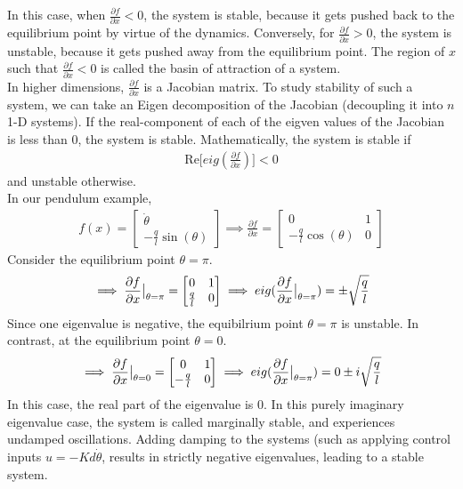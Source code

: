\documentclass{article}
\begin{document}
\noindent
In this case, when $\frac{\partial f}{\partial x}<0$, the system is stable, because it gets pushed back to the equilibrium point by virtue of the dynamics. Conversely, for $\frac{\partial f}{\partial x}>0$, the system is unstable, because it gets pushed away from the equilibrium point.
The region of $x$ such that  $\frac{\partial f}{\partial x}<0$ is called the basin of attraction of a system.
\\

\noindent
In higher dimensions, $\frac{\partial f}{\partial x}$ is a Jacobian matrix. To study stability of such a system, we can take an Eigen decomposition of the Jacobian (decoupling it into $n$ 1-D systems). If the real-component of each of the eigven values of the Jacobian is less than $0$, the system is stable. Mathematically, the system is stable if
\begin{align}
    \textrm{Re} \big[ eig ( \frac{\partial f}{\partial x} ) \big] < 0 
\end{align}
and unstable otherwise. \\

\noindent
In our pendulum example, 
\begin{align}
    f(x) = \begin{bmatrix}
        \dot{\theta} \\
        - \frac{q}{l} \sin(\theta) 
    \end{bmatrix}
    \implies
    \frac{\partial f}{\partial x} = \begin{bmatrix}
        0 & 1 \\
        - \frac{q}{l} \cos(\theta) & 0
    \end{bmatrix}
\end{align}
Consider the equilibrium point $\theta=\pi$. 
\begin{align}
    \implies
        \evalat{\frac{\partial f}{\partial x}}{\theta=\pi} = \begin{bmatrix}
        0 & 1 \\
        \frac{q}{l} & 0
    \end{bmatrix}
    \implies
    eig(\evalat{\frac{\partial f}{\partial x}}{\theta=\pi}) = \pm \sqrt{\frac{q}{l}}
\end{align}
Since one eigenvalue is negative, the equibilrium point $\theta=\pi$ is unstable.
In contrast, at the equilibrium point $\theta=0$. 
\begin{align}
    \implies
        \evalat{\frac{\partial f}{\partial x}}{\theta=0} = \begin{bmatrix}
        0 & 1 \\
        - \frac{q}{l} & 0
    \end{bmatrix}
    \implies
    eig(\evalat{\frac{\partial f}{\partial x}}{\theta=\pi}) = 0 \pm i \sqrt{\frac{q}{l}}
\end{align}
In this case, the real part of the eigenvalue is $0$. In this purely imaginary eigenvalue case, the system is called marginally stable, and experiences undamped oscillations. 
Adding damping to the systems (such as applying control inputs $u = - K d \dot{\theta}$, results in strictly negative eigenvalues, leading to a stable system. 
\end{document}
